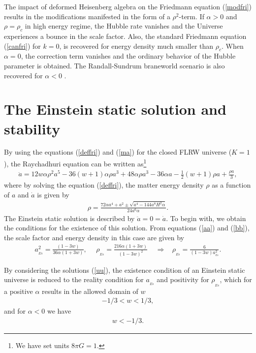 \documentclass[showpacs,amsmath,nofootinbib,amssymb,epsfig]{revtex4}
\begin{document}
The impact of deformed Heisenberg algebra on the Friedmann equation (\ref{modfri})
results in the modifications  manifested in the form of a $\rho^{2}$-term. If $\alpha>0$ and $\rho=\rho_{c}$ in high energy regime,  the Hubble rate vanishes and the Universe experiences a bounce  in the scale factor. Also, the standard Friedmann equation (\ref{canfri}) for $k=0$, is recovered for energy density much smaller than $\rho_{c}$. When  $\alpha=0$, the correction term vanishes and the ordinary behavior of the Hubble parameter is obtained.
The Randall-Sundrum braneworld scenario is also recovered for $\alpha<0$ .

\section{The Einstein static solution and stability}

By using the equations (\ref{deffri}) and (\ref{ma}) for the closed FLRW universe ($K=1$), the Raychadhuri equation can be written as\footnote{We have set units $8\pi G=1$.}
\begin{eqnarray}\label{aa}
\ddot{a}=12 w \alpha  \rho ^2 a^5-36 (w+1) \alpha  \rho  a^3+48 \alpha  \rho  a^3-36 \alpha  a-\frac{1}{2} (w+1) \rho  a+\frac{\rho  a}{3},
\end{eqnarray}
where by solving the equation (\ref{deffri}), the matter energy density $\rho$ as a function of $a$ and $\dot{a}$ is given by
\begin{eqnarray}\label{bb}
\rho=\frac{72 \alpha  a^4+a^2\pm\sqrt{a^4-144 a^8 H^2 \alpha }}{24 a^6 \alpha }.
\end{eqnarray}
The Einstein static solution is described by $\ddot{a} = 0 = \dot{a}$. To begin with, we obtain the conditions
for the existence of this solution. From equations (\ref{aa}) and (\ref{bb}), the scale factor and energy density in this case are given by
\begin{eqnarray}\label{uu}
a^{2}_{_{Es}}=\frac{(1-3w)}{36\alpha(1+3w)},~~~~~~\rho_{_{Es}}=\frac{216\alpha(1+3w)}{(1-3w)^{2}}~~~~~\Longrightarrow~~~~ \rho_{_{Es}}=\frac{6}{(1-3w)a^{2}_{_{Es}}}.
\end{eqnarray}

By considering the solutions (\ref{uu}), the existence condition of an Einstein static universe is reduced to the reality condition for $a_{_{Es}}$ and positivity for $\rho_{_{Es}}$, which for a positive $\alpha$ results in the allowed domain of $w$
\begin{eqnarray}\label{www}
-1/3<w<1/3,
\end{eqnarray}
and for $\alpha<0$ we have
\begin{eqnarray}\label{wwwW}
w<-1/3.
\end{eqnarray}
\end{document}
